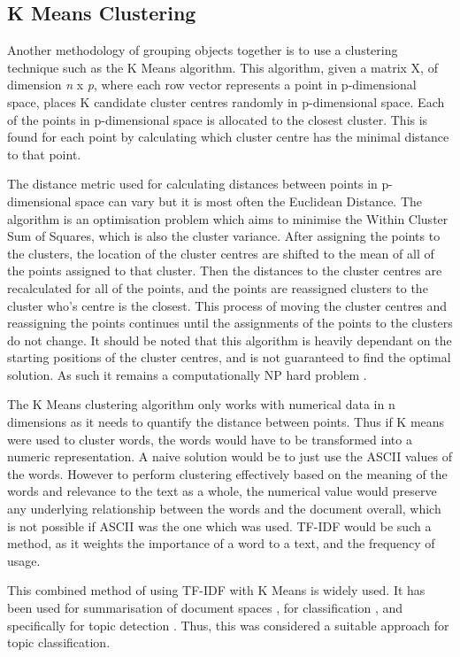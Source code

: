  
\subsection{K Means Clustering}
Another methodology of grouping objects together is to use a clustering technique such as the K Means algorithm. This algorithm, given a matrix X, of dimension \textit{n} x \textit{p}, where each row vector represents a point in p-dimensional space, places K candidate cluster centres randomly in p-dimensional space. Each of the points in p-dimensional space is allocated to the closest cluster. This is found for each point by calculating which cluster centre has the minimal distance to that point. 

The distance metric used for calculating distances between points in p-dimensional space can vary but it is most often the Euclidean Distance. The algorithm is an optimisation problem which aims to minimise the Within Cluster Sum of Squares, which is also the cluster variance. After assigning the points to the clusters, the location of the cluster centres are shifted to the mean of all of the points assigned to that cluster. Then the distances to the cluster centres are recalculated for all of the points, and the points are reassigned clusters to the cluster who's centre is the closest. This process of moving the cluster centres and reassigning the points continues until the assignments of the points to the clusters do not change. It should be noted that this algorithm is heavily dependant on the starting positions of the cluster centres, and is not guaranteed to find the optimal solution. As such it remains a computationally NP hard problem \cite{vattani2009hardness}. 
 
The K Means clustering algorithm only works with numerical data in n dimensions as it needs to quantify the distance between points. Thus if K means were used to cluster words, the words would have to be transformed into a numeric representation. A naive solution would be to just use the ASCII values of the words. However to perform clustering effectively based on the meaning of the words and relevance to the text as a whole, the numerical value would preserve any underlying relationship between the words and the document overall, which is not possible if ASCII was the one which was used. TF-IDF would be such a method, as it weights the importance of a word to a text, and the frequency of usage. 

This combined method of using TF-IDF with K Means is widely used. It has been used for summarisation of document spaces \cite{khan2019extractive}, for classification \cite{buana2012combination}, and specifically for topic detection \cite{6066301}. Thus, this was considered a suitable approach for topic classification.


